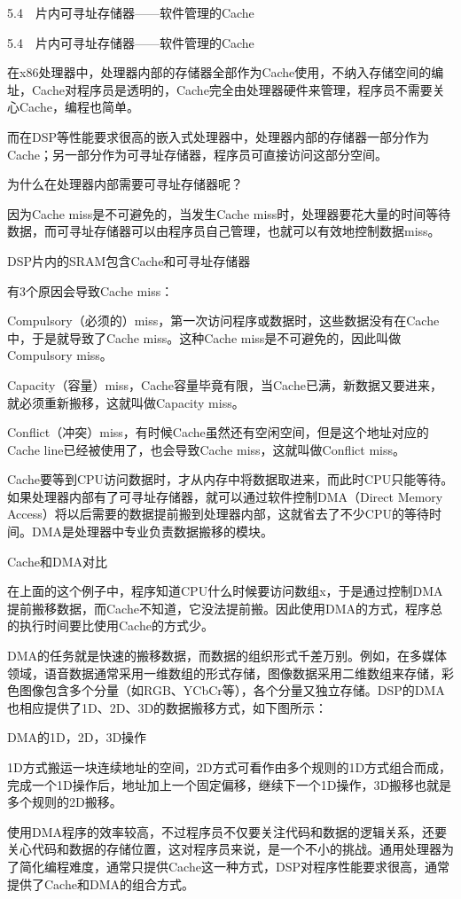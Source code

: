 \documentclass[12pt,UTF8]{ctexbook}
\begin{document}
5.4　片内可寻址存储器——软件管理的Cache


5.4　片内可寻址存储器——软件管理的Cache

在x86处理器中，处理器内部的存储器全部作为Cache使用，不纳入存储空间的编址，Cache对程序员是透明的，Cache完全由处理器硬件来管理，程序员不需要关心Cache，编程也简单。

而在DSP等性能要求很高的嵌入式处理器中，处理器内部的存储器一部分作为Cache；另一部分作为可寻址存储器，程序员可直接访问这部分空间。

为什么在处理器内部需要可寻址存储器呢？

因为Cache miss是不可避免的，当发生Cache miss时，处理器要花大量的时间等待数据，而可寻址存储器可以由程序员自己管理，也就可以有效地控制数据miss。

DSP片内的SRAM包含Cache和可寻址存储器

有3个原因会导致Cache miss：

Compulsory（必须的）miss，第一次访问程序或数据时，这些数据没有在Cache中，于是就导致了Cache miss。这种Cache miss是不可避免的，因此叫做Compulsory miss。

Capacity（容量）miss，Cache容量毕竟有限，当Cache已满，新数据又要进来，就必须重新搬移，这就叫做Capacity miss。

Conflict（冲突）miss，有时候Cache虽然还有空闲空间，但是这个地址对应的Cache line已经被使用了，也会导致Cache miss，这就叫做Conflict miss。

Cache要等到CPU访问数据时，才从内存中将数据取进来，而此时CPU只能等待。如果处理器内部有了可寻址存储器，就可以通过软件控制DMA（Direct Memory Access）将以后需要的数据提前搬到处理器内部，这就省去了不少CPU的等待时间。DMA是处理器中专业负责数据搬移的模块。

Cache和DMA对比

在上面的这个例子中，程序知道CPU什么时候要访问数组x，于是通过控制DMA提前搬移数据，而Cache不知道，它没法提前搬。因此使用DMA的方式，程序总的执行时间要比使用Cache的方式少。

DMA的任务就是快速的搬移数据，而数据的组织形式千差万别。例如，在多媒体领域，语音数据通常采用一维数组的形式存储，图像数据采用二维数组来存储，彩色图像包含多个分量（如RGB、YCbCr等），各个分量又独立存储。DSP的DMA也相应提供了1D、2D、3D的数据搬移方式，如下图所示：

DMA的1D，2D，3D操作

1D方式搬运一块连续地址的空间，2D方式可看作由多个规则的1D方式组合而成，完成一个1D操作后，地址加上一个固定偏移，继续下一个1D操作，3D搬移也就是多个规则的2D搬移。

使用DMA程序的效率较高，不过程序员不仅要关注代码和数据的逻辑关系，还要关心代码和数据的存储位置，这对程序员来说，是一个不小的挑战。通用处理器为了简化编程难度，通常只提供Cache这一种方式，DSP对程序性能要求很高，通常提供了Cache和DMA的组合方式。
\end{document}
